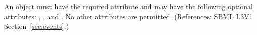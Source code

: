 An \Event object must have the required attribute 
 and may have the following optional attributes:
, ,  and .  
No other attributes are permitted.  
(References: SBML L3V1 Section~\ref{sec:events}.)
